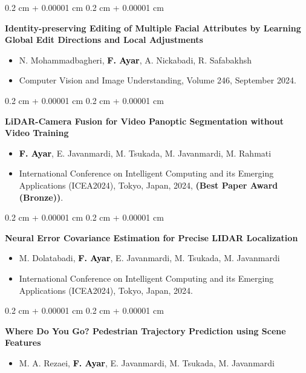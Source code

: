 \documentclass[10pt, letterpaper]{article}
\newenvironment{highlights}{
    \begin{itemize}[
        topsep=0.10 cm,
        parsep=0.10 cm,
        partopsep=0pt,
        itemsep=0pt,
        leftmargin=0.4 cm + 10pt
    ]
}{
    \end{itemize}
} %
\newenvironment{onecolentry}{
    \begin{adjustwidth}{
        0.2 cm + 0.00001 cm
    }{
        0.2 cm + 0.00001 cm
    }
}{
    \end{adjustwidth}
} %
\begin{document}
    \small %
    \begin{samepage}
        \begin{onecolentry}
            \textbf{Identity-preserving Editing of Multiple Facial Attributes by Learning Global Edit Directions and Local Adjustments}
            \begin{highlights}
                \item \textcolor{secondaryColor}{N. Mohammadbagheri, \textcolor{black}{\textbf{F. Ayar}}, A. Nickabadi, R. Safabakhsh}
                \item \textcolor{secondaryColor}{Computer Vision and Image Understanding, Volume 246, September 2024.}
            \end{highlights}
        \end{onecolentry}

        \begin{onecolentry}
            \textbf{LiDAR-Camera Fusion for Video Panoptic Segmentation without Video Training}
            \begin{highlights}
                \item \textcolor{secondaryColor}{\textcolor{black}{\textbf{F. Ayar}}, E. Javanmardi, M. Tsukada, M. Javanmardi, M. Rahmati}
                \item \textcolor{secondaryColor}{International Conference on Intelligent Computing and its Emerging Applications (ICEA2024), Tokyo, Japan, 2024, \textbf{(Best Paper Award (Bronze))}.}
            \end{highlights}
        \end{onecolentry}

        \begin{onecolentry}
            \textbf{Neural Error Covariance Estimation for Precise LIDAR Localization}
            \begin{highlights}
                \item \textcolor{secondaryColor}{M. Dolatabadi, \textcolor{black}{\textbf{F. Ayar}}, E. Javanmardi, M. Tsukada, M. Javanmardi}
                \item \textcolor{secondaryColor}{International Conference on Intelligent Computing and its Emerging Applications (ICEA2024), Tokyo, Japan, 2024.}
            \end{highlights}
        \end{onecolentry}

        \begin{onecolentry}
            \textbf{Where Do You Go? Pedestrian Trajectory Prediction using Scene Features}
            \begin{highlights}
                \item \textcolor{secondaryColor}{M. A. Rezaei, \textcolor{black}{\textbf{F. Ayar}}, E. Javanmardi, M. Tsukada, M. Javanmardi}
            \end{highlights}
        \end{onecolentry}
        

\end{samepage}
\end{document}
